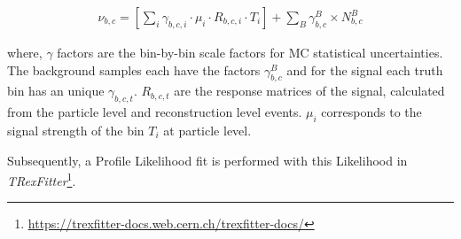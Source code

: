 \begin{align}\label{eq:likelihodd-defn-1}
    \nu_{b,c} = \left[\sum_i \gamma_{b,c,i} \cdot \mu_{i} \cdot R_{b,c,i} \cdot T_{i}\right] + \sum_{B} \gamma_{b,c}^{B} \times N_{b,c}^{B} 
\end{align}

where, $\gamma$ factors are the bin-by-bin scale factors for MC statistical uncertainties. The background samples each have the factors $\gamma_{b,c}^{B}$ and for the signal each truth bin has an unique $\gamma_{b,c,t}$. $R_{b,c,t}$ are the response matrices of the signal, calculated from the particle level and reconstruction level events. $\mu_{i}$ corresponds to the signal strength of the bin $T_{i}$ at particle level.

Subsequently, a Profile Likelihood fit is performed with this Likelihood in \emph{TRexFitter}\footnote{\url{https://trexfitter-docs.web.cern.ch/trexfitter-docs/}}.


